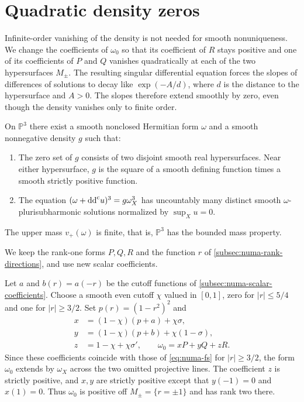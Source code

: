 \section{Quadratic density zeros}
\label{sec:quadratic-density-nonuniqueness}

Infinite-order vanishing of the density is not needed for smooth nonuniqueness. We change the coefficients of $\omega_0$ so that its coefficient of $R$ stays positive and one of its coefficients of $P$ and $Q$ vanishes quadratically at each of the two hypersurfaces $M_\pm$. The resulting singular differential equation forces the slopes of differences of solutions to decay like $\exp(-A/d)$, where $d$ is the distance to the hypersurface and $A>0$. The slopes therefore extend smoothly by zero, even though the density vanishes only to finite order.

\begin{theorem}\label{thm:quadratic-density-nonuniqueness}
On $\mathbb P^3$ there exist a smooth nonclosed Hermitian form $\omega$ and a smooth nonnegative density $g$ such that:
\begin{enumerate}
\item The zero set of $g$ consists of two disjoint smooth real hypersurfaces. Near either hypersurface, $g$ is the square of a smooth defining function times a smooth strictly positive function.
\item The equation $(\omega+\mathrm{dd}^{\mathrm{c}} u)^3=g\omega_X^3$ has uncountably many distinct smooth $\omega$-plurisubharmonic solutions normalized by $\sup_Xu=0$.
\end{enumerate}
The upper mass $v_+(\omega)$ is finite, that is, $\mathbb P^3$ has the bounded mass property.
\end{theorem}

We keep the rank-one forms $P,Q,R$ and the function $r$ of \cref{subsec:numa-rank-directions}, and use new scalar coefficients.

Let $a$ and $b(r)=a(-r)$ be the cutoff functions of \cref{subsec:numa-scalar-coefficients}. Choose a smooth even cutoff $\chi$ valued in $[0,1]$, zero for $|r|\leq5/4$ and one for $|r|\geq3/2$. Set $p(r)=(1-r^2)^2$ and
\begin{equation}\label{eq:quadratic-background}
 \begin{split}
 x&=(1-\chi)(p+a)+\chi\sigma,\\
 y&=(1-\chi)(p+b)+\chi(1-\sigma),\\
 z&=1-\chi+\chi\sigma',\qquad
 \omega_0=xP+yQ+zR.
 \end{split}
\end{equation}
Since these coefficients coincide with those of \eqref{eq:numa-fs} for $|r|\geq3/2$, the form $\omega_0$ extends by $\omega_X$ across the two omitted projective lines. The coefficient $z$ is strictly positive, and $x,y$ are strictly positive except that $y(-1)=0$ and $x(1)=0$. Thus $\omega_0$ is positive off $M_\pm=\{r=\pm1\}$ and has rank two there.

